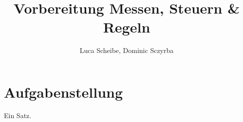 



\frontmatter
\title{Vorbereitung Messen, Steuern \& Regeln}
\author{Luca Scheibe, Dominic Sczyrba}
\maketitle
\tableofcontents

\mainmatter
\section{Aufgabenstellung}
    \label{sec:aufgabenstellung}
    Ein Satz.
